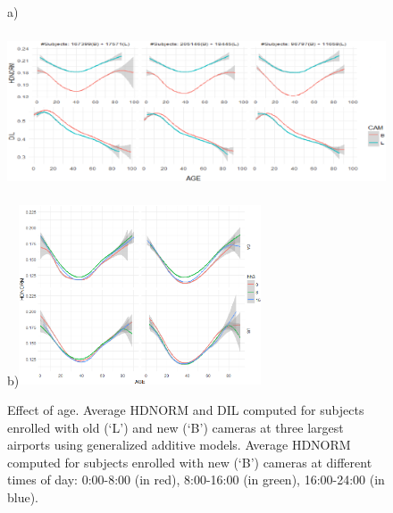 \documentclass{cta-author}%
\begin{document}
\begin{figure} [!t] 
a)\includegraphics[width=0.49\linewidth,height=2.1in]{eps/1-ALL=f(AGE)-2.eps} 
b)\includegraphics[width=0.45\linewidth,height=2.1in]{eps/1M-hh3-best.eps} 

	
	
\caption{
Effect of age. 
 { Average HDNORM and DIL computed 
for subjects enrolled with old (`L') and new (`B') cameras at three largest airports
using generalized additive models. 
}
 {  Average HDNORM  computed for subjects enrolled with new (`B') cameras at different times of day: 0:00-8:00 (in red), 8:00-16:00 (in green), 16:00-24:00 (in blue). 
}
\label{fAGEvsTime}}
\end{figure}
\end{document}
